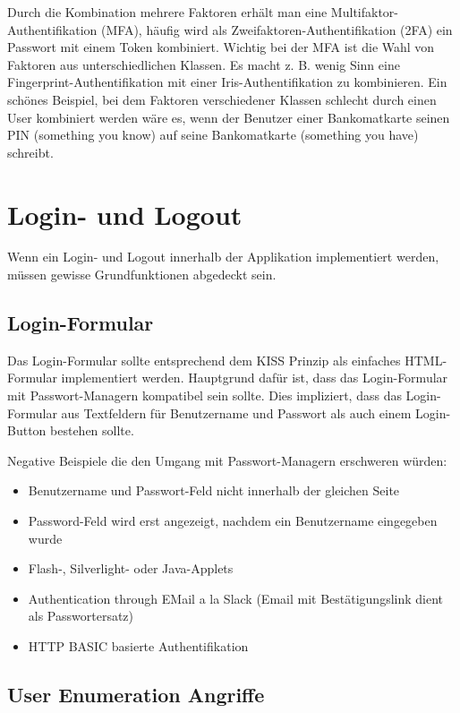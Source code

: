 Durch die Kombination mehrere Faktoren erhält man eine Multifaktor-Authentifikation (MFA), häufig wird als Zweifaktoren-Authentifikation (2FA) ein Passwort mit einem Token kombiniert. Wichtig bei der MFA ist die Wahl von Faktoren aus unterschiedlichen Klassen. Es macht z. B. wenig Sinn eine Fingerprint-Authentifikation mit einer Iris-Authentifikation zu kombinieren. Ein schönes Beispiel, bei dem Faktoren verschiedener Klassen schlecht durch einen User kombiniert werden wäre es, wenn der Benutzer einer Bankomatkarte seinen PIN (something you know) auf seine Bankomatkarte (something you have) schreibt.

\section{Login- und Logout}

Wenn ein Login- und Logout innerhalb der Applikation implementiert werden, müssen gewisse Grundfunktionen abgedeckt sein.

\subsection{Login-Formular}

Das Login-Formular sollte entsprechend dem KISS Prinzip als einfaches HTML-Formular implementiert werden. Hauptgrund dafür ist, dass das Login-Formular mit Passwort-Managern kompatibel sein sollte. Dies impliziert, dass das Login-Formular aus Textfeldern für Benutzername und Passwort als auch einem Login-Button bestehen sollte.

Negative Beispiele die den Umgang mit Passwort-Managern erschweren würden:

\begin{itemize}
	\item Benutzername und Passwort-Feld nicht innerhalb der gleichen Seite
	\item Password-Feld wird erst angezeigt, nachdem ein Benutzername eingegeben wurde
	\item Flash-, Silverlight- oder Java-Applets
	\item Authentication through EMail a la Slack (Email mit Bestätigungslink dient als Passwortersatz)
	\item HTTP BASIC basierte Authentifikation
\end{itemize}

\subsection{User Enumeration Angriffe}

